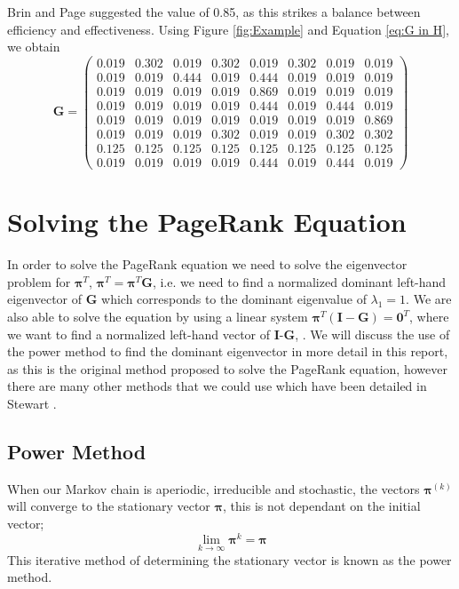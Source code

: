\documentclass[11pt]{report}
\begin{document}
Brin and Page suggested the value of 0.85, as this strikes a balance between efficiency and effectiveness. Using Figure \ref{fig:Example} and Equation \eqref{eq:G in H}, we obtain
\begin{equation*}
\textbf{G} = \left(
\begin{array}{cccccccc}
0.019 & 0.302 & 0.019 & 0.302 & 0.019 & 0.302 & 0.019 & 0.019  \\
0.019 & 0.019 & 0.444 & 0.019 & 0.444 & 0.019 & 0.019 & 0.019  \\
0.019 & 0.019 & 0.019 & 0.019 & 0.869 & 0.019 & 0.019 & 0.019  \\
0.019 & 0.019 & 0.019 & 0.019 & 0.444 & 0.019 & 0.444 & 0.019  \\
0.019 & 0.019 & 0.019 & 0.019 & 0.019 & 0.019 & 0.019 & 0.869  \\
0.019 & 0.019 & 0.019 & 0.302 & 0.019 & 0.019 & 0.302 & 0.302  \\
0.125 & 0.125 & 0.125 & 0.125 & 0.125 & 0.125 & 0.125 & 0.125  \\
0.019 & 0.019 & 0.019 & 0.019 & 0.444 & 0.019 & 0.444 & 0.019 
\end{array}
\right)
\end{equation*}
\section{Solving the PageRank Equation} \label{sec:solve}
In order to solve the PageRank equation we need to solve the eigenvector problem for $\boldsymbol{\pi}^T$, \(\boldsymbol{\pi}^T = \boldsymbol{\pi}^T\textbf{G}\), i.e. we need to find a normalized dominant left-hand eigenvector of \textbf{G} which corresponds to the dominant eigenvalue of $\lambda_1 = 1$. We are also able to solve the equation by using a linear system \(\boldsymbol{\pi}^T(\textbf{I}-\textbf{G})=\textbf{0}^T\), where we want to find a normalized left-hand vector of \textbf{I}-\textbf{G}, \cite{langville}. We will discuss the use of the power method to find the dominant eigenvector in more detail in this report, as this is the original method proposed to solve the PageRank equation, however there are many other methods that we could use which have been detailed in Stewart \cite{stewart1994introduction}.

\subsection{Power Method} \label{sec:power}

When our Markov chain is aperiodic, irreducible and stochastic, the vectors $\boldsymbol\pi^{(k)}$ will converge to the stationary vector $\boldsymbol\pi$, this is not dependant on the initial vector;
\begin{equation*}
\lim_{k\to\infty} \boldsymbol\pi^k = \boldsymbol\pi
\end{equation*}
This iterative method of determining the stationary vector is known as the power method. 
\end{document}
